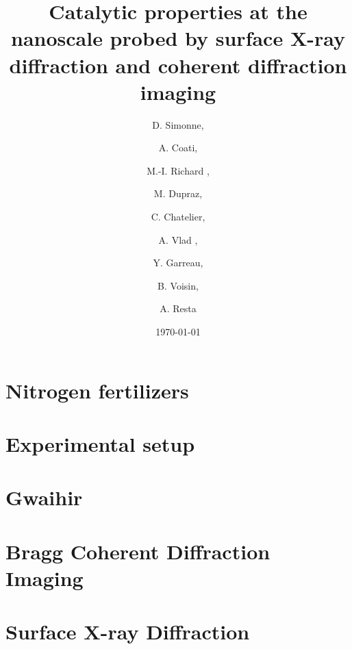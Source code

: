 \documentclass[xcolor=table, t, 9pt, head=0cm]{beamer}
\title[Main Title]
{   
    Catalytic properties at the nanoscale probed by surface X-ray diffraction and coherent diffraction imaging
}
\author
{D. Simonne\inst{1, 2},\and A. Coati\inst{1},\and M.-I. Richard \inst{2, 3},\and M. Dupraz\inst{2, 3},\and C. Chatelier\inst{2, 3},\and A. Vlad \inst{1},\and Y. Garreau\inst{1},\and B. Voisin\inst{1},\and A. Resta\inst{1}}
\institute
{
    \inst{1}
    Synchrotron SOLEIL
    \and
    \inst{2}
    Commissariat à l’énergie atomique et aux énergies alternatives – CEA Grenoble
    \and
    \inst{3}
    ESRF -- The European Synchrotron
}
\date{\footnotesize{\today}}
\begin{document}
	\begin{frame}[plain]
		\titlepage
	\end{frame}

    \section{Nitrogen fertilizers}
        
        
        
        

    
	\section{Experimental setup}
        
        
        
        
        

    \section{Gwaihir}
        
        

    \section{Bragg Coherent Diffraction Imaging}
        
        
        

    \section{Surface X-ray Diffraction}
        
\end{document}
